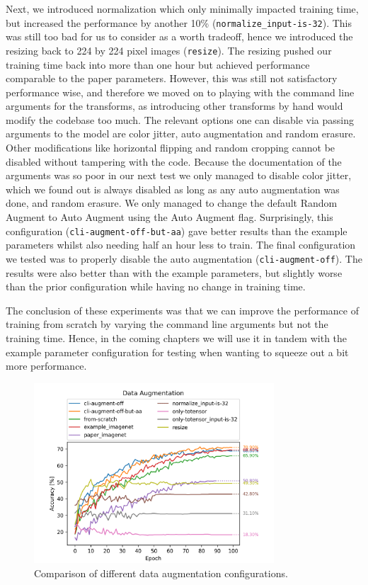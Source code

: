 \documentclass{article}
\begin{document}
Next, we introduced normalization which only minimally impacted training time, but increased the performance by another 10\% (\texttt{normalize\_input-is-32}).
This was still too bad for us to consider as a worth tradeoff, hence we introduced the resizing back to 224 by 224 pixel images (\texttt{resize}).
The resizing pushed our training time back into more than one hour but achieved performance comparable to the paper parameters.
However, this was still not satisfactory performance wise, and therefore we moved on to playing with the command line arguments for the transforms, as introducing other transforms by hand would modify the codebase too much.
The relevant options one can disable via passing arguments to the model are color jitter, auto augmentation and random erasure.
Other modifications like horizontal flipping and random cropping cannot be disabled without tampering with the code.
Because the documentation of the arguments was so poor in our next test we only managed to disable color jitter, which we found out is always disabled as long as any auto augmentation was done, and random erasure.
We only managed to change the default Random Augment to Auto Augment using the Auto Augment flag.
Surprisingly, this configuration (\texttt{cli-augment-off-but-aa}) gave better results than the example parameters whilst also needing half an hour less to train.
The final configuration we tested was to properly disable the auto augmentation (\texttt{cli-augment-off}).
The results were also better than with the example parameters, but slightly worse than the prior configuration while having no change in training time.

The conclusion of these experiments was that we can improve the performance of training from scratch by varying the command line arguments but not the training time.
Hence, in the coming chapters we will use it in tandem with the example parameter configuration for testing when wanting to squeeze out a bit more performance.
\begin{figure}[h]
    \centering
    \includegraphics[width=0.8\textwidth]{images/data_augmentation}
    \caption{Comparison of different data augmentation configurations.}
    \label{fig:data-augmentation}
\end{figure}
\end{document}
